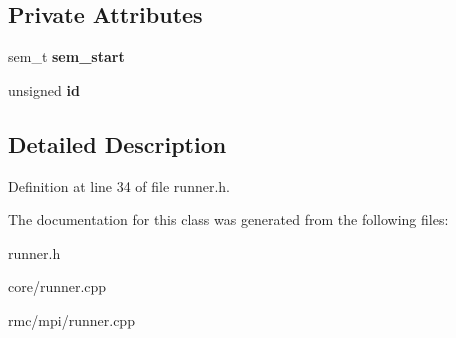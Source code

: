\subsection*{Private Attributes}
\begin{CompactItemize}
\item 
sem\_\-t \bf{sem\_\-start}\label{class_runner_4b0827d5df2df632db4ab71dd55e81b2}

\item 
unsigned \bf{id}\label{class_runner_1989c1f8e0b0b54ad2e60a341007e59d}

\end{CompactItemize}


\subsection{Detailed Description}




Definition at line 34 of file runner.h.

The documentation for this class was generated from the following files:\begin{CompactItemize}
\item 
runner.h\item 
core/runner.cpp\item 
rmc/mpi/runner.cpp\end{CompactItemize}
